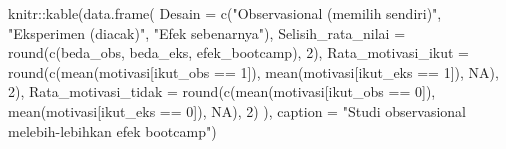 \documentclass[
  indonesian,
  letterpaper,
]{book}
\newenvironment{Shaded}{\begin{snugshade}}{\end{snugshade}}
\newcommand{\AttributeTok}[1]{\textcolor[rgb]{0.40,0.45,0.13}{#1}}
\newcommand{\ConstantTok}[1]{\textcolor[rgb]{0.56,0.35,0.01}{#1}}
\newcommand{\DecValTok}[1]{\textcolor[rgb]{0.68,0.00,0.00}{#1}}
\newcommand{\FunctionTok}[1]{\textcolor[rgb]{0.28,0.35,0.67}{#1}}
\newcommand{\NormalTok}[1]{\textcolor[rgb]{0.00,0.23,0.31}{#1}}
\newcommand{\SpecialCharTok}[1]{\textcolor[rgb]{0.37,0.37,0.37}{#1}}
\newcommand{\StringTok}[1]{\textcolor[rgb]{0.13,0.47,0.30}{#1}}
\begin{document}
\begin{Shaded}
\begin{Highlighting}[]
\NormalTok{knitr}\SpecialCharTok{::}\FunctionTok{kable}\NormalTok{(}\FunctionTok{data.frame}\NormalTok{(}
\AttributeTok{Desain =} \FunctionTok{c}\NormalTok{(}\StringTok{"Observasional (memilih sendiri)"}\NormalTok{, }\StringTok{"Eksperimen (diacak)"}\NormalTok{, }\StringTok{"Efek sebenarnya"}\NormalTok{),}
\AttributeTok{Selisih\_rata\_nilai =} \FunctionTok{round}\NormalTok{(}\FunctionTok{c}\NormalTok{(beda\_obs, beda\_eks, efek\_bootcamp), }\DecValTok{2}\NormalTok{),}
\AttributeTok{Rata\_motivasi\_ikut =} \FunctionTok{round}\NormalTok{(}\FunctionTok{c}\NormalTok{(}\FunctionTok{mean}\NormalTok{(motivasi[ikut\_obs }\SpecialCharTok{==} \DecValTok{1}\NormalTok{]), }\FunctionTok{mean}\NormalTok{(motivasi[ikut\_eks }\SpecialCharTok{==} \DecValTok{1}\NormalTok{]), }\ConstantTok{NA}\NormalTok{), }\DecValTok{2}\NormalTok{),}
\AttributeTok{Rata\_motivasi\_tidak =} \FunctionTok{round}\NormalTok{(}\FunctionTok{c}\NormalTok{(}\FunctionTok{mean}\NormalTok{(motivasi[ikut\_obs }\SpecialCharTok{==} \DecValTok{0}\NormalTok{]), }\FunctionTok{mean}\NormalTok{(motivasi[ikut\_eks }\SpecialCharTok{==} \DecValTok{0}\NormalTok{]), }\ConstantTok{NA}\NormalTok{), }\DecValTok{2}\NormalTok{)}
\NormalTok{), }\AttributeTok{caption =} \StringTok{"Studi observasional melebih{-}lebihkan efek bootcamp"}\NormalTok{)}
\end{Highlighting}
\end{Shaded}
\end{document}
